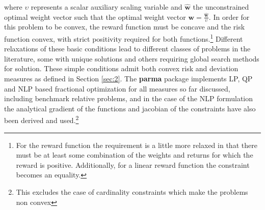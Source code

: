 where $\upsilon$ represents a scalar auxiliary scaling variable and
$\mathbf{\hat w}$ the unconstrained optimal weight vector such that the
optimal weight vector $\mathbf{w}=\frac{\mathbf{\hat w}}{\upsilon}$. In order
for this problem to be convex, the reward function must be concave and the
risk function convex, with strict positivity required for both
functions.\footnote{For the reward function the requirement is a little more
relaxed in that there must be at least some combination of the weights and
returns for which the reward is positive. Additionally, for a linear reward
function the constraint becomes an equality.} Different relaxations of these
basic conditions lead to different classes of problems in the literature,
some with unique solutions and others requiring global search methods for
solution. These simple conditions admit both convex risk and deviation
measures as defined in Section \ref{sec:2}. The \textbf{parma} package
implements LP, QP and NLP based fractional optimization for all measures so
far discussed, including benchmark relative problems, and in the case of
the NLP formulation the analytical gradient of the functions and jacobian
of the constraints have also been derived and used.\footnote{This excludes
the case of cardinality constraints which make the problems non convex}
